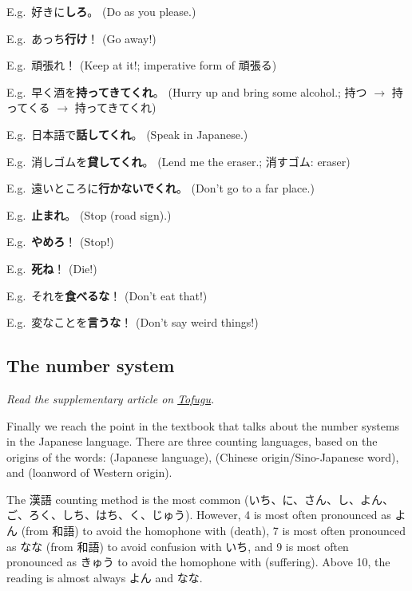 \documentclass[../nihongo-gakushuu-kyouzai-grammar.tex]{subfiles}
\begin{document}

E.g.\ 好きに\textbf{しろ}。 (Do as you please.)

E.g.\ あっち\textbf{行け}！ (Go away!)

E.g.\ 頑張れ！ (Keep at it!; imperative form of 頑張る)

E.g.\ 早く酒を\textbf{持ってきてくれ}。 (Hurry up and bring some alcohol.; 持つ $\to$ 持ってくる $\to$ 持ってきてくれ)

E.g.\ 日本語で\textbf{話してくれ}。 (Speak in Japanese.)

E.g.\ 消しゴムを\textbf{貸してくれ}。 (Lend me the eraser.; 消すゴム: eraser)

E.g.\ 遠いところに\textbf{行かないでくれ}。 (Don't go to a far place.)

E.g.\ \textbf{止まれ}。 (Stop (road sign).)

E.g.\ \textbf{やめろ}！ (Stop!)

E.g.\ \textbf{死ね}！ (Die!)


E.g.\ それを\textbf{食べるな}！ (Don't eat that!)

E.g.\ 変なことを\textbf{言うな}！ (Don't say weird things!)


\subsection{The number system} \label{sec:the-number-system}
\emph{Read the supplementary article on \href{https://www.tofugu.com/japanese/japanese-counters-guide/}{Tofugu}.}

Finally we reach the point in the textbook that talks about the number systems in the Japanese language. There are three counting languages, based on the origins of the words:  (Japanese language),  (Chinese origin/Sino-Japanese word), and  (loanword of Western origin).

The 漢語 counting method is the most common (いち、に、さん、し、よん、ご、ろく、しち、はち、く、じゅう). However, 4 is most often pronounced as よん (from 和語) to avoid the homophone with  (death), 7 is most often pronounced as なな (from 和語) to avoid confusion with いち, and 9 is most often pronounced as きゅう to avoid the homophone with  (suffering). Above 10, the reading is almost always よん and なな.
\end{document}
